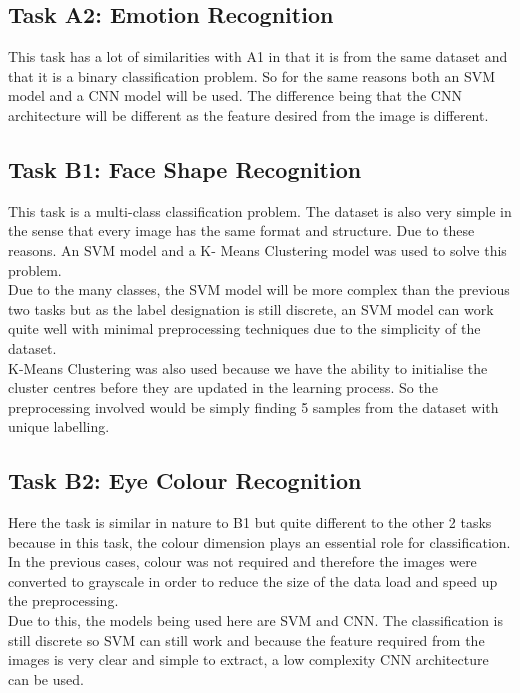 \documentclass{article}
\begin{document}
    \subsection{Task A2: Emotion Recognition}
    This task has a lot of similarities with A1 in that it is from the same dataset and that it is a binary classification problem. So for the same reasons both an SVM model and a CNN model will be used. The difference being that the CNN architecture will be different as the feature desired from the image is different.
    \subsection{Task B1: Face Shape Recognition}
    This task is a multi-class classification problem. The dataset is also very simple in the sense that every image has the same format and structure. Due to these reasons. An SVM model and a K- Means Clustering model was used to solve this problem.\\
    
     Due to the many classes, the SVM model will be more complex than the previous two tasks but as the label designation is still discrete, an SVM model can work quite well with minimal preprocessing techniques due to the simplicity of the dataset.\\
    
     K-Means Clustering was also used because we have the ability to initialise the cluster centres before they are updated in the learning process. So the preprocessing involved would be simply finding 5 samples from the dataset with unique labelling. 
    \subsection{Task B2: Eye Colour Recognition}
    Here the task is similar in nature to B1 but quite different to the other 2 tasks because in this task, the colour dimension plays an essential role for classification. In the previous cases, colour was not required and therefore the images were converted to grayscale in order to reduce the size of the data load and speed up the preprocessing. \\
    
    Due to this, the models being used here are SVM and CNN. The classification is still discrete so SVM can still work and because the feature required from the images is very clear and simple to extract, a low complexity CNN architecture can be used.
\end{document}
